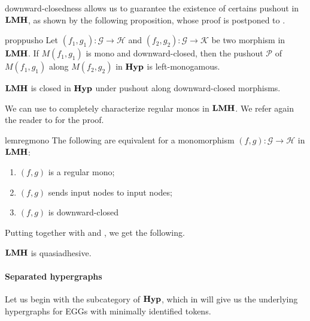 \documentclass[3p]{elsarticle}
\newcommand{\catname}[1]{\textbf{\textup{#1}}}
\newcommand{\lmo}{\catname{LMH}}
\newcommand{\hyp}{\catname{Hyp}}
\theoremstyle{remark}
\theoremstyle{definition}
\begin{document}
downward-closedness allows us to guarantee the existence of certains pushout in $\lmo$, as shown by the following proposition, whose proof is postponed to . 
\begin{restatable}{prop}{pusho}\label{prop:pusho}
Let $(f_1,g_1)\colon \mathcal{G}\to \mathcal{H}$ and $(f_2, g_2)\colon \mathcal{G}\to \mathcal{K}$ be two morphism in $\lmo$. If $M(f_1,g_1)$ is mono and downward-closed, then the pushout $\mathcal{P}$ of $M(f_1,g_1)$ along $M(f_2, g_2)$ in $\hyp$ is left-monogamous.
\end{restatable}

\begin{cor}\label{cor:pusho}
	$\lmo$ is closed in $\hyp$ under pushout along downward-closed morphisms.
\end{cor}

We can use  to completely characterize regular monos in $\lmo$. We refer again the reader to  for the proof.

\begin{restatable}{lem}{regmono}\label{lem:regmon}
	The following are equivalent for a monomorphism $(f,g)\colon \mathcal{G}\to \mathcal{H}$ in $\lmo$:
	\begin{enumerate}
		\item $(f,g)$ is a regular mono;
		\item $(f,g)$ sends input nodes to input nodes;
		\item $(f,g)$ is downward-closed
	\end{enumerate}
\end{restatable}

Putting together  with   and , we get the following.

\begin{cor}$\lmo$ is quasiadhesive.
\end{cor}


\paragraph{Separated hypergraphs}

Let us begin with the subcategory of $\hyp$, which in  will give us the underlying hypergraphs for EGGs with minimally identified tokens.
\end{document}
